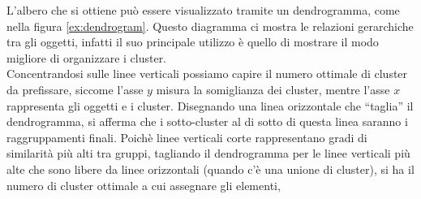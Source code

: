 \documentclass{llncs}
\newcommand{\acapo}{\vspace{0.5\baselineskip}\\}
\begin{document}
	\clearpage
	L'albero che si ottiene può essere visualizzato tramite un dendrogramma, come nella figura \ref{ex:dendrogram}.
	Questo diagramma ci mostra le relazioni gerarchiche tra gli oggetti, infatti il suo principale utilizzo è quello di 
	mostrare il modo migliore di organizzare i cluster. 
	\acapo
	Concentrandosi sulle linee verticali possiamo capire il numero ottimale di cluster
	da prefissare, siccome l'asse $y$ misura la somiglianza dei cluster, mentre l'asse $x$ rappresenta gli oggetti e i cluster.
	Disegnando una linea orizzontale che ``taglia'' il dendrogramma, si afferma che i sotto-cluster al di sotto di questa linea saranno i raggruppamenti finali.
	Poichè linee verticali corte rappresentano gradi di similarità più alti tra gruppi, tagliando il dendrogramma per le linee verticali più alte che sono libere da 
	linee orizzontali (quando c'è una unione di cluster), si ha il numero di cluster ottimale a cui assegnare gli elementi,
\end{document}
